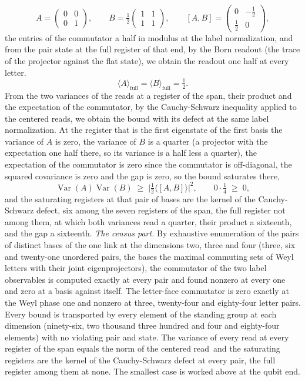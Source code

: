 \begin{chproof}
\begin{equation}
A = \begin{pmatrix} 0 & 0 \\ 0 & 1 \end{pmatrix}, \qquad B = \tfrac{1}{2}\begin{pmatrix} 1 & 1 \\ 1 & 1 \end{pmatrix}, \qquad [A, B] = \begin{pmatrix} 0 & -\tfrac{1}{2} \\ \tfrac{1}{2} & 0 \end{pmatrix} ,
\end{equation}
the entries of the commutator a half in modulus at the label normalization, and from the pair state at the full register of that end, by the Born readout (the trace of the projector against the flat state), we obtain the readout one half at every letter.
\begin{equation}
\langle A \rangle_{\mathrm{full}} = \langle B \rangle_{\mathrm{full}} = \tfrac{1}{2} .
\end{equation}
From the two variances of the reads at a register of the span, their product and the expectation of the commutator, by the Cauchy-Schwarz inequality applied to the centered reads, we obtain the bound with its defect at the same label normalization. At the register that is the first eigenstate of the first basis the variance of $A$ is zero, the variance of $B$ is a quarter (a projector with the expectation one half there, so its variance is a half less a quarter), the expectation of the commutator is zero since the commutator is off-diagonal, the squared covariance is zero and the gap is zero, so the bound saturates there,
\begin{equation}
\operatorname{Var}(A)\operatorname{Var}(B) \;\ge\; \Big|\tfrac{1}{2}\langle [A,B] \rangle\Big|^{2}, \qquad 0 \cdot \tfrac{1}{4} \;\ge\; 0 ,
\end{equation}
and the saturating registers at that pair of bases are the kernel of the Cauchy-Schwarz defect, six among the seven registers of the span, the full register not among them, at which both variances read a quarter, their product a sixteenth, and the gap a sixteenth.
\textit{The census part.}
By exhaustive enumeration of the pairs of distinct bases of the one link at the dimensions two, three and four (three, six and twenty-one unordered pairs, the bases the maximal commuting sets of Weyl letters with their joint eigenprojectors), the commutator of the two label observables is computed exactly at every pair and found nonzero at every one and zero at a basis against itself. The letter-face commutator is zero exactly at the Weyl phase one and nonzero at three, twenty-four and eighty-four letter pairs. Every bound is transported by every element of the standing group at each dimension (ninety-six, two thousand three hundred and four and eighty-four elements) with no violating pair and state. The variance of every read at every register of the span equals the norm of the centered read\, and the saturating registers are the kernel of the Cauchy-Schwarz defect at every pair, the full register among them at none. The smallest case is worked above at the qubit end.

\end{chproof}
